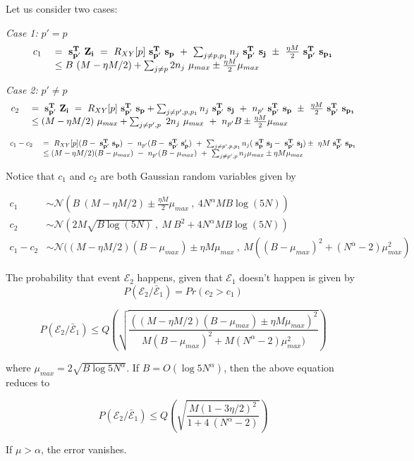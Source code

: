 Let us consider two cases:

{\textit{Case 1:} $p' = p$}
\[
\begin{array}{ll}
c_1 \ &= \ \mathbf{s^T_{p'}} ~\mathbf{Z_i} \ = \ R_{XY}[p] {\bf ~s^T_{p'}~ s_p}\ + \ \sum_{j \neq p,p_1}n_j {\bf ~s^T_{p'}~ s_j} \ \pm \  \frac{\eta M}{2} {\bf ~s^T_{p'} ~ s_{p_1}} \\
&\leq B ~ (M-\eta M/2) +  \sum_{j \neq p} 2 n_j ~ \mu_{max} \pm \frac{\eta M}{2} \mu_{max}
\end{array} 
\]

{\textit{Case 2:} $p' \neq p$}
\[
\begin{array}{ll}
c_2 \ &= \ \mathbf{s^T_{p'}} ~\mathbf{Z_i}\ = \ R_{XY}[p]  {\bf ~s^T_{p'}~ s_p}+ \sum_{j \neq p',p,p_1}n_j{\bf ~s^T_{p'}~ s_j} \ + \ n_{p'} {\bf ~s^T_{p'}~ s_p} \ \pm \ \frac{\eta M}{2} {\bf ~s^T_{p'}~ s_{p_1}}\\
&\leq (M-\eta M/2) ~ \mu_{max} + \sum_{j \neq p',p} \ 2n_j ~ \mu_{max} \ + \ n_{p'} B \pm \frac{\eta M}{2} \mu_{max}
\end{array} 
\]

\[
\begin{array}{ll}
c_1 - c_2 \ &=  \ R_{XY}[p](B - {\bf ~s^T_{p'}~ s_p}) \ - \ n_{p'}(B - {\bf ~s^T_{p'}~ s_p'}) ~ + ~ \sum_{j \neq p',p,p_1}n_j ({\bf ~s^T_{p}~ s_j} - {\bf ~s^T_{p'}~ s_j})  \pm \  \eta M {\bf ~s^T_{p'} ~ s_{p_1}}  \\
&\leq (M-\eta M/2)(B-\mu_{max})  \ - \ n_{p'}(B - \mu_{max}) ~ + ~ \sum_{j \neq p',p}n_j \mu_{max} \pm \eta M \mu_{max}\\
\end{array} 
\]


Notice that $c_1$ and $c_2$ are both Gaussian random variables given by

\[ \begin{array}{ll}
c_1 &\sim  \mathcal{N}(B ~ (M-\eta M/2) \pm \frac{\eta M}{2} \mu_{max} \ , \ 4N^\alpha M B \log(5N)) \\
c_2 &\sim  \mathcal{N}(2M \sqrt{B\log(5N)}\ , \ M~B^2 + 4N^\alpha M B \log(5N))\\
c_1 - c_2 &\sim  \mathcal{N}((M-\eta M/2)(B-\mu_{max}) \pm \eta M \mu_{max} \ , \ M((B-\mu_{max})^2 + (N^{\alpha}-2)\mu_{max}^2)
\end{array}\]

The probability that event $\mathcal{E}_2$ happens, given that $\mathcal{E}_1$ doesn't happen is given by
\[ P(\mathcal{E}_2 / \bar{\mathcal{E}}_1 ) = Pr(c_2 > c_1) \]



\[ P(\mathcal{E}_2 / \bar{\mathcal{E}}_1 ) \leq Q \left( \sqrt{\frac{((M-\eta M/2)(B-\mu_{max}) \pm \eta M \mu_{max})^2}{M(B-\mu_{max})^2 + M(N^{\alpha}-2)\mu_{max}^2)}} \right) \]

where $\mu_{max} = 2\sqrt{B \log 5 N^{\alpha}} $. If $B = O(\log 5 N^{\alpha})$, then the above equation reduces to

\[ P(\mathcal{E}_2 / \bar{\mathcal{E}}_1 ) \leq Q \left( \sqrt{\frac{M(1-3\eta/2)^2}{1 + 4~ (N^{\alpha}-2)}} \right) \]

If $\mu > \alpha$, the error vanishes.
